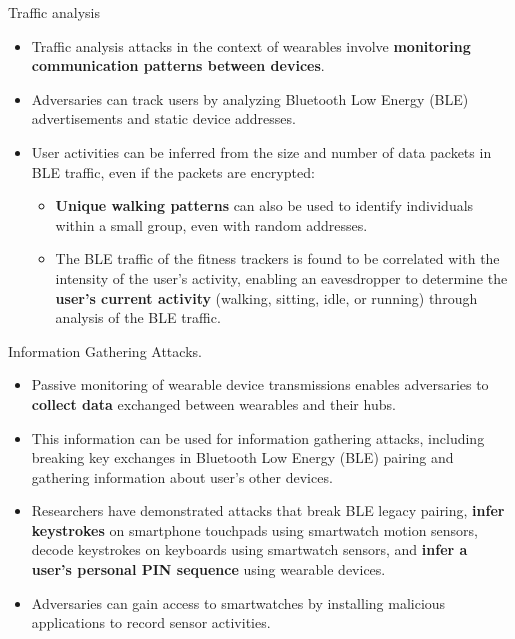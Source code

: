 \documentclass[ucs,9pt]{beamer}
\begin{document}
\begin{frame}{Traffic analysis}
	\begin{itemize}
		\item Traffic analysis attacks in the context of wearables involve \textbf{monitoring communication patterns between devices}.
		\item Adversaries can track users by analyzing Bluetooth Low Energy (BLE) advertisements and static device addresses. 
		\item User activities can be inferred from the size and number of data packets in BLE traffic, even if the packets are encrypted:
		\begin{itemize}
			\item \textbf{Unique walking patterns} can also be used to identify individuals within a small group, even with random 	addresses.
			\item The BLE traffic of the fitness trackers is found to be correlated with the intensity	of the user’s activity, enabling an eavesdropper to determine 		the \textbf{user’s current activity} (walking, sitting, idle, or running) through analysis of the BLE traffic.
		\end{itemize} 
	\end{itemize}
\end{frame}

\begin{frame}{Information Gathering Attacks.}
	\begin{itemize}
		\item Passive monitoring of wearable device transmissions enables adversaries to \textbf{collect data} exchanged between wearables and their hubs. 
		\item This information can be used for information gathering attacks, including breaking key exchanges in Bluetooth Low Energy (BLE) pairing and gathering information about user's other devices. 
		\item Researchers have demonstrated attacks that break BLE legacy pairing, \textbf{infer keystrokes} on smartphone touchpads using smartwatch motion sensors, decode keystrokes on keyboards using smartwatch sensors, and\textbf{ infer a user's personal PIN sequence} using wearable devices.
		\item Adversaries can gain access to smartwatches by installing malicious applications to record sensor activities. 
	\end{itemize}
\end{frame}
\end{document}
